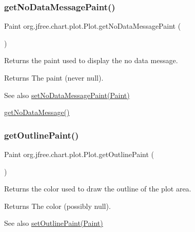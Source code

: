 \subsubsection{\texorpdfstring{get\+No\+Data\+Message\+Paint()}{getNoDataMessagePaint()}}
{\footnotesize\ttfamily Paint org.\+jfree.\+chart.\+plot.\+Plot.\+get\+No\+Data\+Message\+Paint (\begin{DoxyParamCaption}{ }\end{DoxyParamCaption})}

Returns the paint used to display the \textquotesingle{}no data\textquotesingle{} message.

\begin{DoxyReturn}{Returns}
The paint (never {\ttfamily null}).
\end{DoxyReturn}
\begin{DoxySeeAlso}{See also}
\mbox{\hyperlink{classorg_1_1jfree_1_1chart_1_1plot_1_1_plot_a5c60638325f40e3bc67520ef612872d9}{set\+No\+Data\+Message\+Paint(\+Paint)}} 

\mbox{\hyperlink{classorg_1_1jfree_1_1chart_1_1plot_1_1_plot_a6a121d914481157af8e29f372ff130eb}{get\+No\+Data\+Message()}} 
\end{DoxySeeAlso}
\mbox{\label{classorg_1_1jfree_1_1chart_1_1plot_1_1_plot_a003c8c8187f26e68a01b9f35db79a556}} 
\subsubsection{\texorpdfstring{get\+Outline\+Paint()}{getOutlinePaint()}}
{\footnotesize\ttfamily Paint org.\+jfree.\+chart.\+plot.\+Plot.\+get\+Outline\+Paint (\begin{DoxyParamCaption}{ }\end{DoxyParamCaption})}

Returns the color used to draw the outline of the plot area.

\begin{DoxyReturn}{Returns}
The color (possibly {\ttfamily null}).
\end{DoxyReturn}
\begin{DoxySeeAlso}{See also}
\mbox{\hyperlink{classorg_1_1jfree_1_1chart_1_1plot_1_1_plot_af93be31b03f8952fd039f33458135c8b}{set\+Outline\+Paint(\+Paint)}} 
\end{DoxySeeAlso}
\mbox{\label{classorg_1_1jfree_1_1chart_1_1plot_1_1_plot_ad2bb94f76f8470681c1b3c41c388deb8}} 
